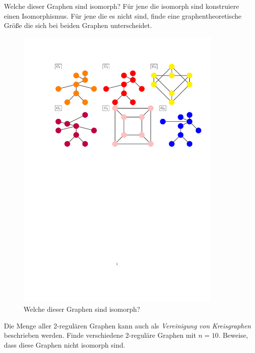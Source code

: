 		Welche dieser Graphen sind isomorph? F\"ur jene die isomorph sind konstruiere einen Isomorphismus. F\"ur jene die es nicht sind, finde eine graphentheoretische Gr\"o\ss e die sich bei beiden Graphen unterscheidet.
		\begin{figure}[h]
    \centering
    \includegraphics[width=0.9\textwidth]{isomorphism_cut.pdf}
    \caption{\label{isomorphismus} Welche dieser Graphen sind isomorph?}

\end{figure}

\subexercise[%
  topic=2-regul\"are Graphen,
    ]
Die Menge aller 2-regul\"aren Graphen kann auch als \emph{Vereinigung von Kreisgraphen} beschrieben werden. Finde verschiedene 2-regul\"are Graphen mit $n=10$. 
Beweise, dass diese Graphen nicht isomorph sind.
\clearpage 
\exercise[%
  topic = Kantenf\"arbung 
    ]

\subexercise[%
  topic=Kantenf\"arbung eines Graphen,
    ]

